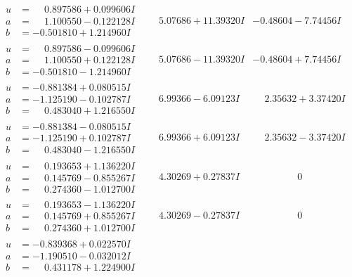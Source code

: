 \documentclass[1p]{elsarticle_modified}
\theoremstyle{definition}
\begin{document}
$$\begin{array}{c|c|c}
\begin{aligned}
u &= \phantom{-}0.897586 + 0.099606 I \\
a &= \phantom{-}1.100550 - 0.122128 I \\
b &= -0.501810 + 1.214960 I\end{aligned}
 & \phantom{-}5.07686 + 11.39320 I & -0.48604 - 7.74456 I \\ \hline\begin{aligned}
u &= \phantom{-}0.897586 - 0.099606 I \\
a &= \phantom{-}1.100550 + 0.122128 I \\
b &= -0.501810 - 1.214960 I\end{aligned}
 & \phantom{-}5.07686 - 11.39320 I & -0.48604 + 7.74456 I \\ \hline\begin{aligned}
u &= -0.881384 + 0.080515 I \\
a &= -1.125190 - 0.102787 I \\
b &= \phantom{-}0.483040 + 1.216550 I\end{aligned}
 & \phantom{-}6.99366 - 6.09123 I & \phantom{-}2.35632 + 3.37420 I \\ \hline\begin{aligned}
u &= -0.881384 - 0.080515 I \\
a &= -1.125190 + 0.102787 I \\
b &= \phantom{-}0.483040 - 1.216550 I\end{aligned}
 & \phantom{-}6.99366 + 6.09123 I & \phantom{-}2.35632 - 3.37420 I \\ \hline\begin{aligned}
u &= \phantom{-}0.193653 + 1.136220 I \\
a &= \phantom{-}0.145769 - 0.855267 I \\
b &= \phantom{-}0.274360 - 1.012700 I\end{aligned}
 & \phantom{-}4.30269 + 0.27837 I & \phantom{-0.000000 } 0 \\ \hline\begin{aligned}
u &= \phantom{-}0.193653 - 1.136220 I \\
a &= \phantom{-}0.145769 + 0.855267 I \\
b &= \phantom{-}0.274360 + 1.012700 I\end{aligned}
 & \phantom{-}4.30269 - 0.27837 I & \phantom{-0.000000 } 0 \\ \hline\begin{aligned}
u &= -0.839368 + 0.022570 I \\
a &= -1.190510 - 0.032012 I \\
b &= \phantom{-}0.431178 + 1.224900 I\end{aligned}

\end{array}$$
\end{document}
